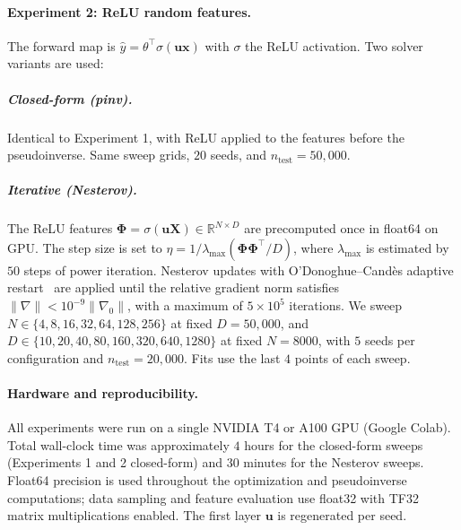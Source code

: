 \documentclass[11pt]{article}
\theoremstyle{plain}
\theoremstyle{definition}
\theoremstyle{remark}
\begin{document}
\paragraph{Experiment 2: ReLU random features.} The forward map is $\hat y = \theta^\top \sigma(\mathbf{u}\mathbf{x})$ with $\sigma$ the ReLU activation. Two solver variants are used:

\subparagraph{\emph{Closed-form (pinv).}} Identical to Experiment 1, with ReLU applied to the features before the pseudoinverse. Same sweep grids, $20$ seeds, and $n_{\mathrm{test}} = 50{,}000$.




\subparagraph{\emph{Iterative (Nesterov).}} The ReLU features $\boldsymbol{\Phi} = \sigma(\mathbf{u}\mathbf{X}) \in \mathbb{R}^{N \times D}$ are precomputed once in float64 on GPU. The step size is set to $\eta = 1/\lambda_{\max}(\boldsymbol{\Phi}\boldsymbol{\Phi}^\top/D)$, where $\lambda_{\max}$ is estimated by $50$ steps of power iteration. Nesterov updates with O'Donoghue--Cand{\`e}s adaptive restart~\citep{odonoghue2015adaptive} are applied until the relative gradient norm satisfies $\|\nabla\| < 10^{-9}\|\nabla_0\|$, with a maximum of $5 \times 10^5$ iterations. We sweep $N \in \{4, 8, 16, 32, 64, 128, 256\}$ at fixed $D = 50{,}000$, and $D \in \{10, 20, 40, 80, 160, 320, 640, 1280\}$ at fixed $N = 8000$, with $5$ seeds per configuration and $n_{\mathrm{test}} = 20{,}000$. Fits use the last $4$ points of each sweep.

\paragraph{Hardware and reproducibility.} All experiments were run on a single NVIDIA T4 or A100 GPU (Google Colab). Total wall-clock time was approximately $4$ hours for the closed-form sweeps (Experiments 1 and 2 closed-form) and $30$ minutes for the Nesterov sweeps. Float64 precision is used throughout the optimization and pseudoinverse computations; data sampling and feature evaluation use float32 with TF32 matrix multiplications enabled. The first layer $\mathbf{u}$ is regenerated per seed.
\end{document}
